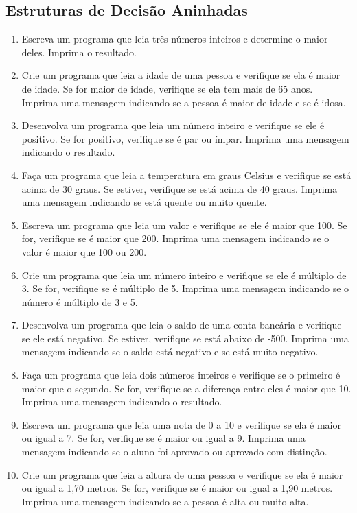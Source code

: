\documentclass{article}
\begin{document}
\subsection*{Estruturas de Decisão Aninhadas}

\begin{enumerate}
    \item Escreva um programa que leia três números inteiros e determine o maior deles. Imprima o resultado.
    
    \item Crie um programa que leia a idade de uma pessoa e verifique se ela é maior de idade. Se for maior de idade, verifique se ela tem mais de 65 anos. Imprima uma mensagem indicando se a pessoa é maior de idade e se é idosa.
    
    \item Desenvolva um programa que leia um número inteiro e verifique se ele é positivo. Se for positivo, verifique se é par ou ímpar. Imprima uma mensagem indicando o resultado.
    
    \item Faça um programa que leia a temperatura em graus Celsius e verifique se está acima de 30 graus. Se estiver, verifique se está acima de 40 graus. Imprima uma mensagem indicando se está quente ou muito quente.
    
    \item Escreva um programa que leia um valor e verifique se ele é maior que 100. Se for, verifique se é maior que 200. Imprima uma mensagem indicando se o valor é maior que 100 ou 200.
    
    \item Crie um programa que leia um número inteiro e verifique se ele é múltiplo de 3. Se for, verifique se é múltiplo de 5. Imprima uma mensagem indicando se o número é múltiplo de 3 e 5.
    
    \item Desenvolva um programa que leia o saldo de uma conta bancária e verifique se ele está negativo. Se estiver, verifique se está abaixo de -500. Imprima uma mensagem indicando se o saldo está negativo e se está muito negativo.
    
    \item Faça um programa que leia dois números inteiros e verifique se o primeiro é maior que o segundo. Se for, verifique se a diferença entre eles é maior que 10. Imprima uma mensagem indicando o resultado.
    
    \item Escreva um programa que leia uma nota de 0 a 10 e verifique se ela é maior ou igual a 7. Se for, verifique se é maior ou igual a 9. Imprima uma mensagem indicando se o aluno foi aprovado ou aprovado com distinção.
    
    \item Crie um programa que leia a altura de uma pessoa e verifique se ela é maior ou igual a 1,70 metros. Se for, verifique se é maior ou igual a 1,90 metros. Imprima uma mensagem indicando se a pessoa é alta ou muito alta.
\end{enumerate}
\end{document}
